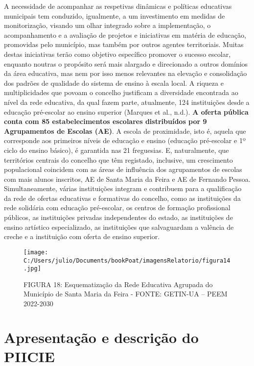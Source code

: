 \documentclass[
]{book}
\begin{document}
A necessidade de acompanhar as respetivas dinâmicas e políticas educativas municipais tem conduzido, igualmente, a um investimento em medidas de monitorização, visando um olhar integrado sobre a implementação, o acompanhamento e a avaliação de projetos e iniciativas em matéria de educação, promovidas pelo município, mas também por outros agentes territoriais. Muitas destas iniciativas terão como objetivo específico promover o sucesso escolar, enquanto noutras o propósito será mais alargado e direcionado a outros domínios da área educativa, mas nem por isso menos relevantes na elevação e consolidação dos padrões de qualidade do sistema de ensino à escala local.
A riqueza e multiplicidades que povoam o concelho justificam a diversidade encontrada ao nível da rede educativa, da qual fazem parte, atualmente, 124 instituições desde a educação pré-escolar ao ensino superior (Marques et al., n.d.). \textbf{A oferta pública conta com 85 estabelecimentos escolares distribuídos por 9 Agrupamentos de Escolas (AE)}. A escola de proximidade, isto é, aquela que corresponde aos primeiros níveis de educação e ensino (educação pré-escolar e 1º ciclo do ensino básico), é garantida nas 21 freguesias. E, naturalmente, que territórios centrais do concelho que têm registado, inclusive, um crescimento populacional coincidem com as áreas de influência dos agrupamentos de escolas com mais alunos inscritos, AE de Santa Maria da Feira e AE de Fernando Pessoa. Simultaneamente, várias instituições integram e contribuem para a qualificação da rede de ofertas educativas e formativas do concelho, como as instituições da rede solidária com educação pré-escolar, os centros de formação profissional públicos, as instituições privadas independentes do estado, as instituições de ensino artístico especializado, as instituições que salvaguardam a valência de creche e a instituição com oferta de ensino superior.

\begin{figure}
\centering
\texttt{[image: C:/Users/julio/Documents/bookPoat/imagensRelatorio/figura14.jpg]}
\caption{FIGURA 18: Esquematização da Rede Educativa Agrupada do Município de Santa Maria da Feira - FONTE: GETIN-UA -- PEEM 2022-2030}
\end{figure}

\hypertarget{apresentauxe7uxe3o-e-descriuxe7uxe3o-do-piicie}{%
\section{\texorpdfstring{\textbf{Apresentação e descrição do PIICIE}}{Apresentação e descrição do PIICIE}}\label{apresentauxe7uxe3o-e-descriuxe7uxe3o-do-piicie}}
\end{document}
